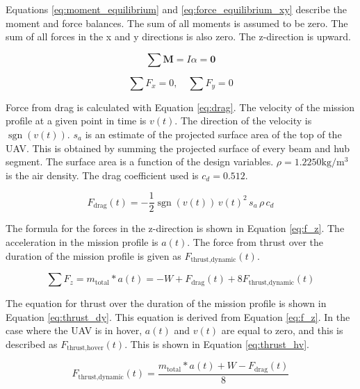 \documentclass[doublespace,nopageskip]{VTthesis}
\begin{document}
		Equations \ref{eq:moment_equilibrium} and \ref{eq:force_equilibrium_xy} describe the moment and force balances. The sum of all moments is assumed to be zero. The sum of all forces in the x and y directions is also zero. The z-direction is upward. 
		
		\begin{equation}
			\sum \mathbf{M} = I\alpha = \mathbf{0}
			\label{eq:moment_equilibrium}
		\end{equation}
		
		\begin{equation}
			\sum F_x = 0, \quad \sum F_y = 0
			\label{eq:force_equilibrium_xy}
		\end{equation}
		
		Force from drag is calculated with Equation \ref{eq:drag}. The velocity of the mission profile at a given point in time is $v(t)$. The direction of the velocity is $\operatorname{sgn}(v(t))$. $s_a$ is an estimate of the projected surface area of the top of the UAV. This is obtained by summing the projected surface of every beam and hub segment. The surface area is a function of the design variables. $\rho = 1.2250\unit{\kilogram\per\meter\cubed}$ is the air density. The drag coefficient used is $c_d = 0.512$.
		
		\begin{equation}
			F_{\text{drag}}(t) = -\frac{1}{2}\operatorname{sgn}(v(t))\, v(t)^2 \, s_a \, \rho \, c_d
			\label{eq:drag}
		\end{equation}
		
		The formula for the forces in the z-direction is shown in Equation \ref{eq:f_z}. The acceleration in the mission profile is $a(t)$. The force from thrust over the duration of the mission profile is given as $F_{\text{thrust,dynamic}}(t)$. 
		
		\begin{equation}
			\sum F_z = m_\text{total} *a(t) = -W + F_{\text{drag}}(t) + 8F_{\text{thrust,dynamic}}(t)
			\label{eq:f_z}
		\end{equation}
		
		 The equation for thrust over the duration of the mission profile is shown in Equation \ref{eq:thrust_dy}. This equation is derived from Equation \ref{eq:f_z}. In the case where the UAV is in hover, $a(t)$ and $v(t)$ are equal to zero, and this is described as $F_{\text{thrust,hover}}(t)$. This is shown in Equation \ref{eq:thrust_hv}. 
		
		\begin{equation}
			F_{\text{thrust,dynamic}}(t) = \frac{m_\text{total} *a(t) + W - F_{\text{drag}}(t)}{8}
			\label{eq:thrust_dy}
		\end{equation}
		
\end{document}
